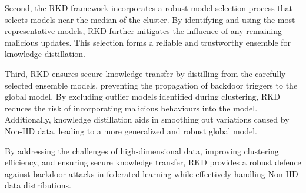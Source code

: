 Second, the RKD framework incorporates a robust model selection process that selects models near the median of the cluster. By identifying and using the most representative models, RKD further mitigates the influence of any remaining malicious updates. This selection forms a reliable and trustworthy ensemble for knowledge distillation.

Third, RKD ensures secure knowledge transfer by distilling from the carefully selected ensemble models, preventing the propagation of backdoor triggers to the global model. By excluding outlier models identified during clustering, RKD reduces the risk of incorporating malicious behaviours into the model. Additionally, knowledge distillation aids in smoothing out variations caused by Non-IID data, leading to a more generalized and robust global model.

By addressing the challenges of high-dimensional data, improving clustering efficiency, and ensuring secure knowledge transfer, RKD provides a robust defence against backdoor attacks in federated learning while effectively handling Non-IID data distributions.
